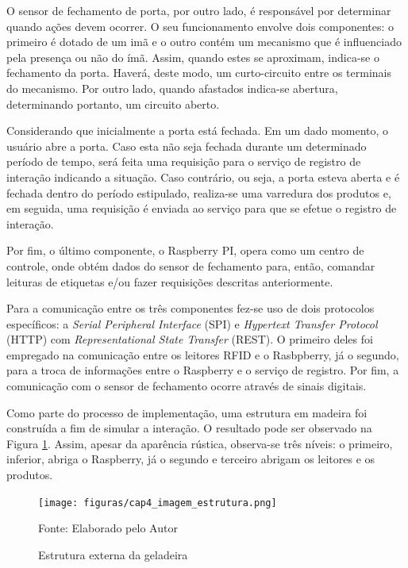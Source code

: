 O sensor de fechamento de porta, por outro lado, é responsável por determinar quando ações devem ocorrer. O seu funcionamento envolve dois componentes: o primeiro é dotado de um imã e o outro contém um mecanismo que é influenciado pela presença ou não do ímã. Assim, quando estes se aproximam, indica-se o fechamento da porta. Haverá, deste modo, um curto-circuito entre os terminais do mecanismo. Por outro lado, quando afastados indica-se abertura, determinando portanto, um circuito aberto.



Considerando que inicialmente a porta está fechada. Em um dado momento, o usuário abre a porta. Caso esta não seja fechada durante um determinado período de tempo, será feita uma requisição para o serviço de registro de interação indicando a situação. Caso contrário, ou seja, a porta esteva aberta e é fechada dentro do período estipulado, realiza-se uma varredura dos produtos e, em seguida, uma requisição é enviada ao serviço para que se efetue o registro de interação.

Por fim, o último componente, o Raspberry PI, opera como um centro de controle, onde obtém dados do sensor de fechamento para, então, comandar leituras de etiquetas e/ou fazer requisições descritas anteriormente.

Para a comunicação entre os três componentes fez-se uso de dois protocolos específicos: a \textit{Serial Peripheral Interface} (SPI) e \textit{Hypertext Transfer Protocol} (HTTP) com \textit{Representational State Transfer} (REST). O primeiro deles foi empregado na comunicação entre os leitores RFID e o Rasbpberry, já o segundo, para a troca de informações entre o Raspberry e o serviço de registro. Por fim, a comunicação com o sensor de fechamento ocorre através de sinais digitais.

Como parte do processo de implementação, uma estrutura em madeira foi construída a fim de simular a interação. O resultado pode ser observado na Figura \ref{fig:cap4_imagem_estrutura}. Assim, apesar da aparência rústica, observa-se três níveis: o primeiro, inferior, abriga o Raspberry, já o segundo e terceiro abrigam os leitores e os produtos.

\begin{figure}[H]
    \caption{Estrutura externa da geladeira}
    \label{fig:cap4_imagem_estrutura}
    \texttt{[image: figuras/cap4\_imagem\_estrutura.png]}
    
    \footnotesize{Fonte: Elaborado pelo Autor}
\end{figure}


